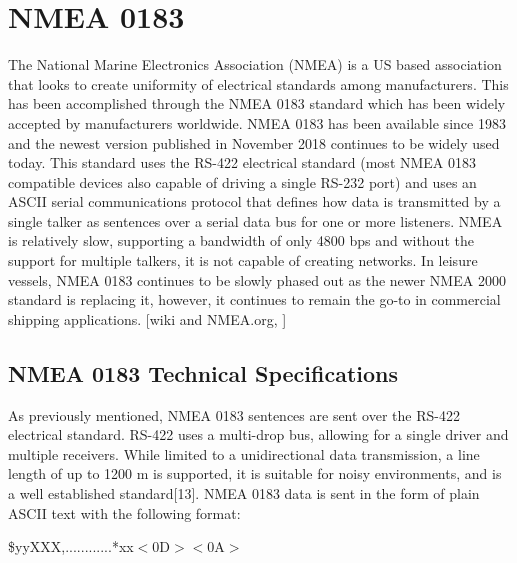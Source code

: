 \documentclass{report}
\begin{document}
\section{NMEA 0183}
The National Marine Electronics Association (NMEA) is a US based association that looks to create uniformity of electrical standards among manufacturers. This has been accomplished through the NMEA 0183 standard which has been widely accepted by manufacturers worldwide. NMEA 0183 has been available since 1983 and the newest version published in November 2018 continues to be widely used today. This standard uses the RS-422 electrical standard (most NMEA 0183 compatible devices also capable of driving a single RS-232 port) and uses an ASCII serial communications protocol that defines how data is transmitted by a single talker as sentences over a serial data bus for one or more listeners. NMEA is relatively slow, supporting a bandwidth of only 4800 bps and without the support for multiple talkers, it is not capable of creating networks. In leisure vessels, NMEA 0183 continues to be slowly phased out as the newer NMEA 2000 standard is replacing it, however, it continues to remain the go-to in commercial shipping applications.
[wiki and NMEA.org, ]  

\subsection{NMEA 0183 Technical Specifications}

As previously mentioned, NMEA 0183 sentences are sent over the RS-422 electrical standard. RS-422 uses a multi-drop bus, allowing for a single driver and multiple receivers. While limited to a unidirectional data transmission, a line length of up to 1200 m is supported, it is suitable for noisy environments, and is a well established standard[13].
\vspace{5mm} %
NMEA 0183 data is sent in the form of plain ASCII text with the following format:  

\begin{center}
    \$yyXXX,............*xx$<$0D$><$0A$>$
\end{center}
\end{document}
